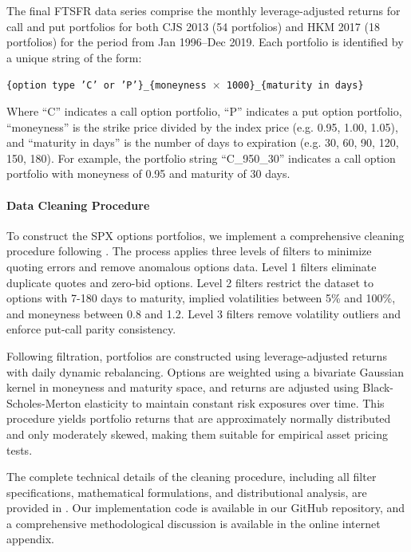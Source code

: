 \documentclass{article}
\begin{document}
\begin{appendices}
The final FTSFR data series comprise the monthly leverage-adjusted returns for call and put portfolios for both CJS 2013 (54 portfolios) and HKM 2017 (18 portfolios) for the period from Jan 1996--Dec 2019. Each portfolio is identified by a unique string of the form: 

\begin{center}
{\texttt{\{option type 'C' or 'P'\}\_\{moneyness $\times$ 1000\}\_\{maturity in days\}}}
\end{center}

Where ``C'' indicates a call option portfolio, ``P'' indicates a put option portfolio, ``moneyness'' is the strike price divided by the index price (e.g. 0.95, 1.00, 1.05), and ``maturity in days'' is the number of days to expiration (e.g. 30, 60, 90, 120, 150, 180). For example, the portfolio string ``C\_950\_30'' indicates a call option portfolio with moneyness of 0.95 and maturity of 30 days.



\paragraph{Data Cleaning Procedure}

To construct the SPX options portfolios, we implement a comprehensive cleaning procedure following \citet{Constantinides2013}. The process applies three levels of filters to minimize quoting errors and remove anomalous options data. Level 1 filters eliminate duplicate quotes and zero-bid options. Level 2 filters restrict the dataset to options with 7-180 days to maturity, implied volatilities between 5\% and 100\%, and moneyness between 0.8 and 1.2. Level 3 filters remove volatility outliers and enforce put-call parity consistency.

Following filtration, portfolios are constructed using leverage-adjusted returns with daily dynamic rebalancing. Options are weighted using a bivariate Gaussian kernel in moneyness and maturity space, and returns are adjusted using Black-Scholes-Merton elasticity to maintain constant risk exposures over time. This procedure yields portfolio returns that are approximately normally distributed and only moderately skewed, making them suitable for empirical asset pricing tests.

The complete technical details of the cleaning procedure, including all filter specifications, mathematical formulations, and distributional analysis, are provided in \citet{Constantinides2013}. Our implementation code is available in our GitHub repository, and a comprehensive methodological discussion is available in the online internet appendix.




\end{appendices}
\end{document}
